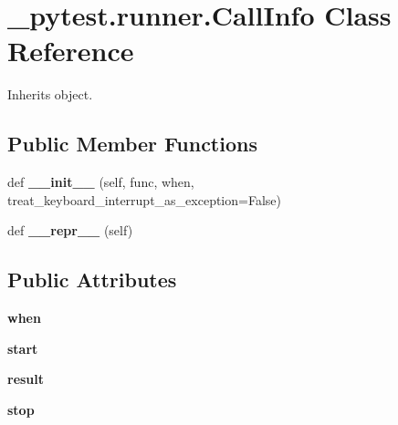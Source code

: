 \hypertarget{class__pytest_1_1runner_1_1_call_info}{}\section{\+\_\+pytest.\+runner.\+Call\+Info Class Reference}
\label{class__pytest_1_1runner_1_1_call_info}


Inherits object.

\subsection*{Public Member Functions}
\begin{DoxyCompactItemize}
\item 
\mbox{\label{class__pytest_1_1runner_1_1_call_info_ac9052b39a4782e1e7fe3285b387b2524}} 
def {\bfseries \+\_\+\+\_\+init\+\_\+\+\_\+} (self, func, when, treat\+\_\+keyboard\+\_\+interrupt\+\_\+as\+\_\+exception=False)
\item 
\mbox{\label{class__pytest_1_1runner_1_1_call_info_a006a3ae2c0554c56b148db15ceca6d5d}} 
def {\bfseries \+\_\+\+\_\+repr\+\_\+\+\_\+} (self)
\end{DoxyCompactItemize}
\subsection*{Public Attributes}
\begin{DoxyCompactItemize}
\item 
\mbox{\label{class__pytest_1_1runner_1_1_call_info_a942d8e4d4d6b95bb6b7f2c460eabc1b7}} 
{\bfseries when}
\item 
\mbox{\label{class__pytest_1_1runner_1_1_call_info_a2cc0fa72c4ee7ca83d1fd1ec0d75d35a}} 
{\bfseries start}
\item 
\mbox{\label{class__pytest_1_1runner_1_1_call_info_ad02e059581f0d9cbc7c6e147623e2591}} 
{\bfseries result}
\item 
\mbox{\label{class__pytest_1_1runner_1_1_call_info_a421bb8cfe6dcd57ecc40672e75c373c7}} 
{\bfseries stop}
\end{DoxyCompactItemize}
